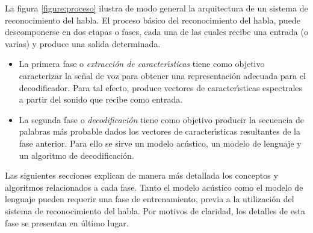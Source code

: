 La figura \ref{figure:proceso} ilustra de modo general la arquitectura de un sistema de reconocimiento del habla.
El proceso b\'asico del reconocimiento del habla, puede descomponerse en dos etapas o fases, cada una de las cuales
recibe una entrada (o varias) y produce una salida determinada.

\begin{itemize}
\item La primera fase o \emph{extracci\'on de caracter{\'\i}sticas} tiene como objetivo caracterizar la se\~nal
de voz para obtener una representaci\'on adecuada para el decodificador. Para tal efecto, produce vectores de
caracter{\'\i}sticas espectrales a partir del sonido que recibe como entrada.
\item La segunda fase o \emph{decodificaci\'on} tiene como objetivo producir la secuencia de palabras m\'as probable
dados los vectores de caracter{\'\i}sticas resultantes de la fase anterior. Para ello se sirve un modelo ac\'ustico, un
modelo de lenguaje y un algoritmo de decodificaci\'on.
\end{itemize}

Las siguientes secciones explican de manera m\'as detallada los conceptos y algoritmos relacionados a cada fase.
Tanto el modelo ac\'ustico como el modelo de lenguaje pueden requerir una fase de entrenamiento, 
previa a la utilizaci\'on del sistema de reconocimiento del habla.
Por motivos de claridad, los detalles de esta fase se presentan en \'ultimo lugar.



